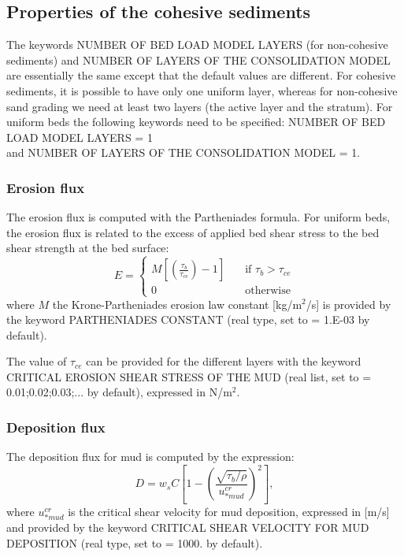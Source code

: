 \subsection{Properties of the cohesive sediments}
The keywords {\ttfamily NUMBER OF BED LOAD MODEL LAYERS} (for non-cohesive sediments) and {\ttfamily NUMBER OF LAYERS OF THE CONSOLIDATION MODEL} are essentially the same except that the default values are different. For cohesive sediments, it is possible to have only one uniform layer, whereas for non-cohesive sand grading we need at least two layers (the active layer and the stratum).
For uniform beds the following keywords need to be specified: {\ttfamily NUMBER OF BED LOAD MODEL LAYERS = 1}\\
and {\ttfamily NUMBER OF LAYERS OF THE CONSOLIDATION MODEL = 1}.

\subsubsection{Erosion flux}
The erosion flux is computed with the Partheniades formula. For uniform beds, the erosion flux is related to the excess of
applied bed shear stress to the bed shear strength at the bed surface:
\begin{equation*}
E = \left\{\begin{array}{ll}
M\left[\left(\frac{\tau_b}{\tau_{ce}}\right)-1\right]\quad & \text{if}\,\,\tau_b> \tau_{ce}\\
0\quad & \text{otherwise}
\end{array}
\right.
\end{equation*}
where $M$ the Krone-Partheniades erosion law constant [kg/m$^2$/s] is provided by the keyword {\ttfamily PARTHENIADES CONSTANT} (real type, set to {\ttfamily = 1.E-03} by default).

The value of $\tau_{ce}$ can be provided for the different layers with the keyword {\ttfamily CRITICAL EROSION SHEAR STRESS OF THE MUD} (real list, set to {\ttfamily = 0.01;0.02;0.03;...} by default), expressed in N/m$^2$.

\subsubsection{Deposition flux}
The deposition flux for mud is computed by the expression:
\begin{equation}
D = w_{s} C \left[1-\left(\frac{\sqrt{\tau_b/\rho}}{u_{*mud}^{cr}}\right)^2 \right],
\end{equation}
where $u_{*mud}^{cr}$ is the critical shear velocity for mud deposition, expressed in [m/s] and provided by the keyword {\ttfamily CRITICAL SHEAR VELOCITY FOR MUD DEPOSITION} (real type, set to {\ttfamily = 1000.} by default).

